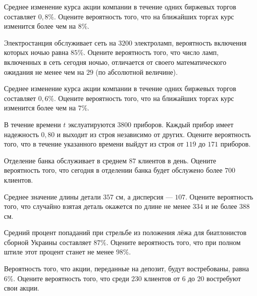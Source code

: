 \vfill

\newpage\setcounter{zad}{0}

\z Среднее изменение курса акции компании в течение одних биржевых торгов составляет $ 0{,}8 \% $. Оцените вероятность того, что на ближайших торгах курс изменится более чем на $ 8 \% $.


\vfill

\z Электростанция обслуживает сеть на $ 3200 $ электроламп, вероятность включения которых ночью равна $ 85 \% $. Оцените вероятность того, что число ламп, включенных в сеть сегодня ночью, отличается от своего математического ожидания не менее чем на $ 29 $ (по абсолютной величине). 
 

\vfill

\newpage\setcounter{zad}{0}

\z Среднее изменение курса акции компании в течение одних биржевых торгов составляет $ 0{,}6 \% $. Оцените вероятность того, что на ближайших торгах курс изменится более чем на $ 7 \% $.


\vfill

\z В течение времени $t$ экслуатируются $ 3800 $ приборов. Каждый прибор имеет надежность $ 0{,}80 $ и выходит из строя независимо от других. Оцените вероятность того, что в течение указанного времени выйдут из строя от $ 119 $ до $ 171 $ приборов.
 

\vfill

\newpage\setcounter{zad}{0}

\z Отделение банка обслуживает в среднем $ 87 $ клиентов в день. Оцените вероятность того, что сегодня в отделении банка будет обслужено более $ 700 $ клиентов.


\vfill

\z Среднее значение длины детали $ 357 $ см, а дисперсия --- $ 107 $. Оцените вероятность того, что случайно взятая деталь окажется по длине не менее $ 334 $ и не более $ 388 $ см.
 

\vfill

\newpage\setcounter{zad}{0}

\z Средний процент попаданий при стрельбе из положения лёжа для биатлонистов сборной Украины составляет $ 87 \% $. Оцените вероятность того, что при полном штиле этот процент станет не менее $ 98 \% $.


\vfill

\z Вероятность того, что акции, переданные на депозит, будут востребованы, равна $ 6 \% $. Оцените вероятность того, что среди $ 230 $ клиентов от $ 6 $ до $ 20 $ востребуют свои акции.
 

\vfill

\newpage\setcounter{zad}{0}